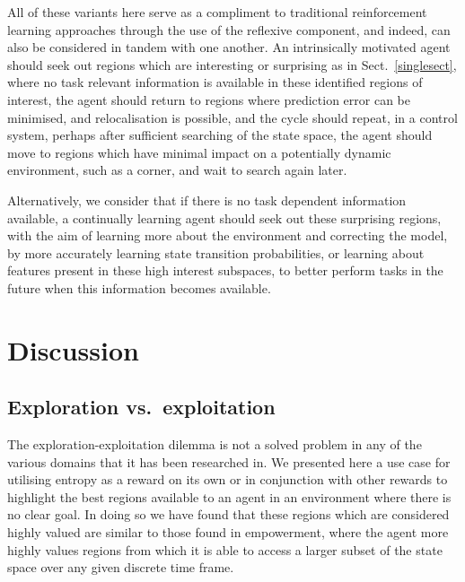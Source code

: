 \documentclass{article}
\begin{document}

All of these variants here serve as a compliment to traditional reinforcement learning approaches through the use of the reflexive component, and indeed, can also be considered in tandem with one another. An intrinsically motivated agent should seek out regions which are interesting or surprising as in Sect.~\ref{singlesect}, where no task relevant information is available in these identified regions of interest, the agent should return to regions where prediction error can be minimised, and relocalisation is possible, and the cycle should repeat, in a control system, perhaps after sufficient searching of the state space, the agent should move to regions which have minimal impact on a potentially dynamic environment, such as a corner, and wait to search again later.

Alternatively, we consider that if there is no task dependent information available, a continually learning agent should seek out these surprising regions, with the aim of learning more about the environment and correcting the model, by more accurately learning state transition probabilities, or learning about features present in these high interest subspaces, to better perform tasks in the future when this information becomes available.


\section{Discussion\label{Discussion}}

\subsection{Exploration vs.~exploitation}

The exploration-exploitation dilemma is not a solved problem in any of the various domains that it has been researched in. We presented here a use case for utilising entropy as a reward on its own or in conjunction with other rewards to highlight the best regions available to an agent in an environment where there is no clear goal. In doing so we have found that these regions which are considered highly valued are similar to those found in empowerment, where the agent more highly values regions from which it is able to access a larger subset of the state space over any given discrete time frame.
\end{document}
